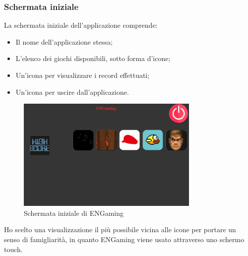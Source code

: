 \subsubsection{Schermata iniziale}
La schermata iniziale dell'applicazione comprende:
\begin{itemize}
    \item Il nome dell'applicazione stessa;
    \item L'elenco dei giochi disponibili, sotto forma d'icone;
    \item Un'icona per visualizzare i record effettuati;
    \item Un'icona per uscire dall'applicazione.
\end{itemize}
\begin{figure}[h]
    \centering
    \includegraphics[width=250pt]{images/product/schermataIniziale.png}
    \caption{Schermata iniziale di ENGaming}
    \label{fig:schermataIniziale}
\end{figure}
Ho scelto una visualizzazione il più possibile vicina alle icone per portare un senso di famigliarità, in quanto ENGaming viene usato attraverso uno schermo touch.
\newpage
